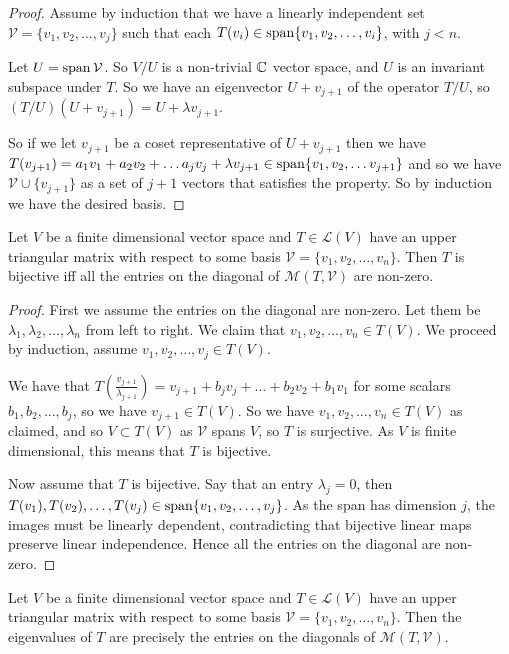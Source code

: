 \documentclass[]{article}
\begin{document}
\begin{proof}
		Assume by induction that we have a linearly independent set $\mathcal{V} = \{v_1, v_2, \ldots, v_j\}$ such that each $T(v_i) \in \operatorname{span}\{v_1, v_2, \ldots, v_i\}$, with $j < n$. 

		Let $U = \operatorname{span} \mathcal{V}$. So $V / U$ is a non-trivial $\mathbb{C}$ vector space, and $U$ is an invariant subspace under $T$. So we have an eigenvector $U + v_{j+1}$ of the operator $T / U$, so $(T / U)(U + v_{j+1}) = U + \lambda v_{j+1}$. 

		So if we let $v_{j+1}$ be a coset representative of $U + v_{j+1}$ then we have $T(v_{j+1}) = a_1 v_1 + a_2 v_2 + \ldots a_j v_j + \lambda v_{j+1} \in \operatorname{span}\{v_1, v_2, \ldots v_{j+1}\}$ and so we have $\mathcal{V} \cup \{v_{j+1}\}$ as a set of $j + 1$ vectors that satisfies the property. So by induction we have the desired basis.
\end{proof}

\begin{thm}
		Let $V$ be a finite dimensional vector space and $T \in \mathcal{L}(V)$  have an upper triangular matrix with respect to some basis $\mathcal{V} = \{v_1, v_2, \ldots, v_n\}$. Then $T$ is bijective iff all the entries on the diagonal of $\mathcal{M}(T, \mathcal{V})$ are non-zero.
\end{thm}

\begin{proof}
		First we assume the entries on the diagonal are non-zero. Let them be $\lambda_1, \lambda_2, \ldots, \lambda_n$ from left to right. We claim that $v_1, v_2, \ldots, v_n \in T(V)$. We proceed by induction, assume $v_1, v_2, \ldots, v_j \in T(V)$. 

		We have that $T(\frac{v_{j+1}}{\lambda_{j+1}}) = v_{j+1} + b_j v_j + \ldots + b_2 v_2 + b_1 v_1$ for some scalars $b_1, b_2, \ldots, b_j$, so we have $v_{j+1} \in T(V)$. So we have $v_1, v_2, \ldots, v_n \in T(V)$ as claimed, and so $V \subset T(V)$ as $\mathcal{V}$ spans $V$, so $T$ is surjective. As $V$ is finite dimensional, this means that $T$ is bijective.

		Now assume that $T$ is bijective. Say that an entry $\lambda_j = 0$, then $T(v_1), T(v_2), \ldots, T(v_j) \in \operatorname{span}\{v_1, v_2, \ldots, v_j\}$. As the span has dimension $j$, the images must be linearly dependent, contradicting that bijective linear maps preserve linear independence. Hence all the entries on the diagonal are non-zero.
\end{proof}

\begin{thm}
		Let $V$ be a finite dimensional vector space and $T \in \mathcal{L}(V)$  have an upper triangular matrix with respect to some basis $\mathcal{V} = \{v_1, v_2, \ldots, v_n\}$. Then the eigenvalues of $T$ are precisely the entries on the diagonals of $\mathcal{M}(T,\mathcal{V})$.
\end{thm}
\end{document}
